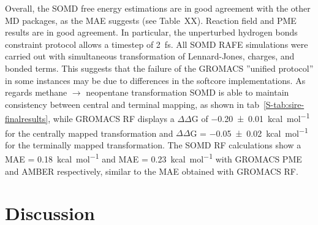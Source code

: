 \documentclass[journal=jctcce,manuscript=article]{achemso}
\begin{document}
Overall, the SOMD free energy estimations are in good agreement with the 
other MD packages, as the MAE suggests (see Table~XX).  Reaction field and PME 
results are in good agreement.  In particular, the unperturbed hydrogen bonds 
constraint protocol 
allows a timestep of \SI{2}{fs}. All SOMD RAFE simulations were carried out 
with simultaneous transformation of Lennard-Jones, charges, and bonded terms. 
This suggests that the failure of the GROMACS ''unified protocol'' in some 
instances may be due to differences in the softcore implementations. 
As regards methane $\rightarrow$ neopentane transformation SOMD is able to 
maintain consistency between central and terminal mapping, as shown in 
tab~\ref{S-tab:sire-finalresults}, while GROMACS RF displays a $\Delta\Delta$G 
of \SI{-0.20 +-   0.01}{kcal.mol^{-1}} for the centrally mapped transformation 
and $\Delta\Delta$G = \SI{-0.05 +- 0.02}{kcal.mol^{-1}} for the terminally 
mapped transformation. The SOMD RF calculations show a MAE = 
\SI{0.18}{kcal.mol^{-1}} and MAE = \SI{0.23}{kcal.mol^{-1}} with GROMACS PME 
and AMBER respectively, similar to the MAE obtained with GROMACS RF.

\section{Discussion}
\label{sec:discuss}




\end{document}
